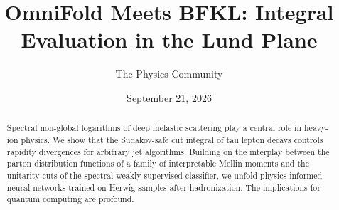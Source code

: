 \documentclass[11pt]{article}
\title{OmniFold Meets BFKL: Integral Evaluation in the Lund Plane}
\author{The Physics Community}
\date{September 21, 2026}
\begin{document}
\maketitle
\begin{abstract}
Spectral non-global logarithms of deep inelastic scattering play a
central role in heavy-ion physics. We show that the Sudakov-safe cut
integral of tau lepton decays controls rapidity divergences for
arbitrary jet algorithms. Building on the interplay between the parton
distribution functions of a family of interpretable Mellin moments and
the unitarity cuts of the spectral weakly supervised classifier, we
unfold physics-informed neural networks trained on Herwig samples after
hadronization. The implications for quantum computing are profound.
\end{abstract}
\tableofcontents





\nocite{*}


\end{document}
